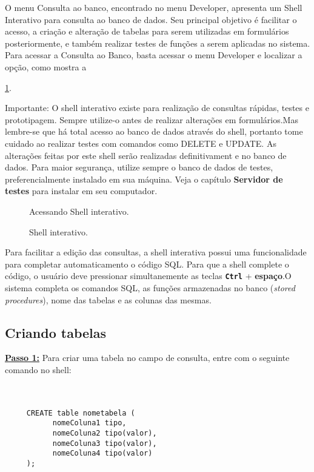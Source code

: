 \documentclass[9pt]{report}
\begin{document}
    O menu Consulta ao banco, encontrado no menu Developer,
    apresenta um Shell Interativo para consulta ao banco de dados.
    Seu principal objetivo é facilitar o acesso, a criação e
    alteração de tabelas para serem utilizadas em formulários
    posteriormente,
    e também realizar testes de funções a serem aplicadas no sistema.
    Para acessar a Consulta ao Banco, basta acessar o menu Developer
    e localizar a opção, como mostra a \figurename{ \ref{fig:acessoShell}.
    
    Importante: O shell interativo existe para realização de
    consultas rápidas, testes e prototipagem. Sempre utilize-o antes
    de realizar alterações em formulários.Mas lembre-se que há total
    acesso ao banco de dados através do shell, portanto tome cuidado
    ao realizar testes com comandos como DELETE e UPDATE. As
    alterações feitas por este shell serão realizadas definitivament
    e no banco de dados. Para maior segurança, utilize sempre o
    banco de dados de testes, preferencialmente instalado em sua
    máquina.
    Veja o capítulo \textbf{Servidor de testes} para instalar em
    seu computador.
   
   
     \begin{figure}[H]
       \caption{Acessando Shell interativo.}
       \label{fig:acessoShell}
     \end{figure}

     \begin{figure}[H]
       \caption{Shell interativo.}
       \label{fig:shell}
     \end{figure}

     Para facilitar a edição das consultas, a shell interativa possui
     uma funcionalidade para completar automaticamento o código SQL.
     Para que a shell complete o código, o usuário deve pressionar
     simultanemente as teclas \texttt{\textbf{Ctrl}} + {\textbf{espaço}}.O sistema completa os comandos SQL, as funções
     armazenadas no banco (\textit{stored procedures}), nome das
     tabelas e as colunas das mesmas.
     
   \subsection{Criando tabelas}

   \underline{\textbf{Passo 1:}}  Para criar uma tabela no campo de
   consulta, entre com o seguinte comando no shell:
   \\
   \\
   \\
   \begin{lstlisting}
     CREATE table nometabela (
           nomeColuna1 tipo,
           nomeColuna2 tipo(valor),
           nomeColuna3 tipo(valor),
           nomeColuna4 tipo(valor)
     );
   \end{lstlisting}

}
\end{document}
